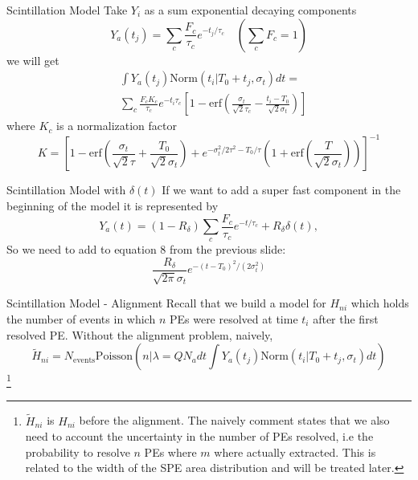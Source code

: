 \documentclass{beamer}
\newcommand\blfootnote[1]{%
  \begingroup
  \renewcommand\thefootnote{}\footnote{#1}%
  \addtocounter{footnote}{-1}%
  \endgroup
}
\begin{document}
\begin{frame}{Scintillation Model}
Take $Y_i$ as a sum exponential decaying components
\begin{equation}
Y_a(t_j)=\sum_c\frac{F_c}{\tau_c}e^{-t_j/\tau_c} \quad (\sum_cF_c=1)
\end{equation}
we will get 
\begin{equation}
\begin{split}
&\int Y_a(t_j)\text{Norm}(t_i|T_0+t_j, \sigma_t)dt=\\
&\sum_c\frac{F_cK_c}{\tau_c}e^{-t_i\tau_c}\left[1-\text{erf}\left(\frac{\sigma_t}{\sqrt{2}\tau_c}-\frac{t_i-T_0}{\sqrt{2}\sigma_t}\right)\right]
\end{split}
\end{equation}
where $K_c$ is a normalization factor
\begin{equation}
K=\left[1-\text{erf}\left(\frac{\sigma_t}{\sqrt{2}\tau}+\frac{T_0}{\sqrt{2}\sigma_t}\right)+e^{-\sigma_t^2/2\tau^2-T_0/\tau}\left(1+\text{erf}\left(\frac{T}{\sqrt{2}\sigma_t}\right)\right)\right]^{-1}
\end{equation}
\end{frame}

\begin{frame}{Scintillation Model with $\delta(t)$}
If we want to add a super fast component in the beginning of the model it is represented by
\begin{equation}
Y_a(t)=(1-R_\delta)\sum_c\frac{F_c}{\tau_c}e^{-t/\tau_c}+R_\delta\delta(t),
\end{equation}
So we need to add to equation 8 from the previous slide:
\begin{equation}
\frac{R_\delta}{\sqrt{2\pi}\sigma_t}e^{-(t-T_0)^2/(2\sigma_t^2)}
\end{equation}
\end{frame}

\begin{frame}{Scintillation Model - Alignment}
Recall that we build a model for $H_{ni}$ which holds the number of events in which $n$ PEs were resolved at time $t_i$ after the first resolved PE.
Without the alignment problem, naively, 
\begin{equation}
\tilde{H}_{ni}=N_{\text{events}}\text{Poisson}\left(n\bigg|\lambda=QN_adt\int Y_a(t_j)\text{Norm}(t_i|T_0+t_j, \sigma_t)dt\right)
\end{equation}
\blfootnote{$\tilde{H}_{ni}$ is $H_{ni}$ before the alignment. The naively comment states that we also need to account the uncertainty in the number of PEs resolved, i.e the probability to resolve $n$ PEs where $m$ where actually extracted. This is related to the width of the SPE area distribution  and will be treated later.}
\end{frame}
\end{document}
